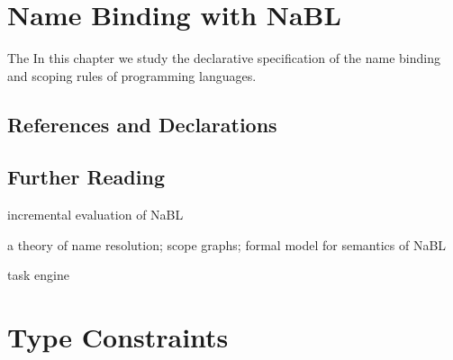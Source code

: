\chapter{Name Binding with NaBL}

The
In this chapter we study the declarative specification of the name binding and
scoping rules of programming languages. 

\section{References and Declarations}





\section{Further Reading}

\cite{WachsmuthKVGV13} incremental evaluation of NaBL

\cite{NeronTVW15} a theory of name resolution; scope graphs; formal model for
semantics of NaBL

\cite{WachsmuthKVGV13} task engine

\chapter{Type Constraints}

